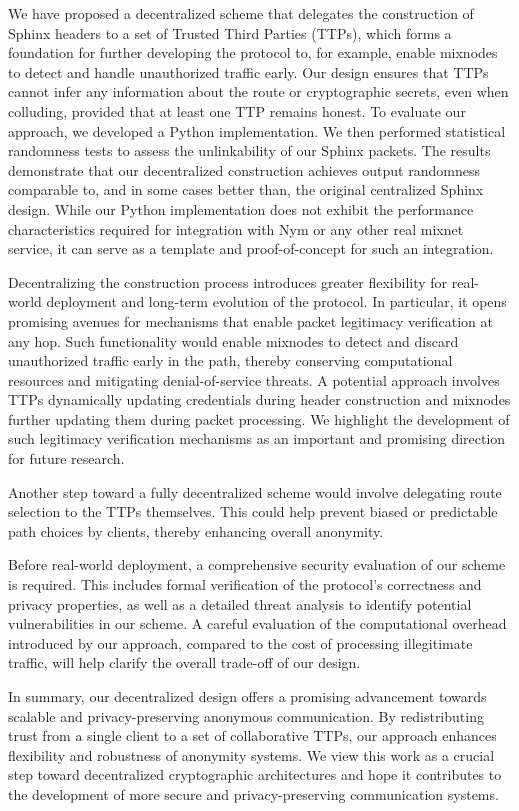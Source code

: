 We have proposed a decentralized scheme that delegates the construction of Sphinx headers to a set of Trusted Third Parties (TTPs), which forms a foundation for further developing the protocol to, for example, enable mixnodes to detect and handle unauthorized traffic early.
Our design ensures that TTPs cannot infer any information about the route or cryptographic secrets, even when colluding, provided that at least one TTP remains honest.
To evaluate our approach, we developed a Python implementation. 
We then performed statistical randomness tests to assess the unlinkability of our Sphinx packets.
The results demonstrate that our decentralized construction achieves output randomness comparable to, and in some cases better than, the original centralized Sphinx design.
While our Python implementation does not exhibit the performance characteristics required for integration with Nym or any other real mixnet service, it can serve as a template and proof-of-concept for such an integration.

Decentralizing the construction process introduces greater flexibility for real-world deployment and long-term evolution of the protocol.
In particular, it opens promising avenues for mechanisms that enable packet legitimacy verification at any hop.
Such functionality would enable mixnodes to detect and discard unauthorized traffic early in the path, thereby conserving computational resources and mitigating denial-of-service threats. 
A potential approach involves TTPs dynamically updating credentials during header construction and mixnodes further updating them during packet processing.
We highlight the development of such legitimacy verification mechanisms as an important and promising direction for future research.

Another step toward a fully decentralized scheme would involve delegating route selection to the TTPs themselves.
This could help prevent biased or predictable path choices by clients, thereby enhancing overall anonymity.

Before real-world deployment, a comprehensive security evaluation of our scheme is required. 
This includes formal verification of the protocol's correctness and privacy properties, as well as a detailed threat analysis to identify potential vulnerabilities in our scheme. 
A careful evaluation of the computational overhead introduced by our approach, compared to the cost of processing illegitimate traffic, will help clarify the overall trade-off of our design.

In summary, our decentralized design offers a promising advancement towards scalable and privacy-preserving anonymous communication.
By redistributing trust from a single client to a set of collaborative TTPs, our approach enhances flexibility and robustness of anonymity systems.
We view this work as a crucial step toward decentralized cryptographic architectures and hope it contributes to the development of more secure and privacy-preserving communication systems.
